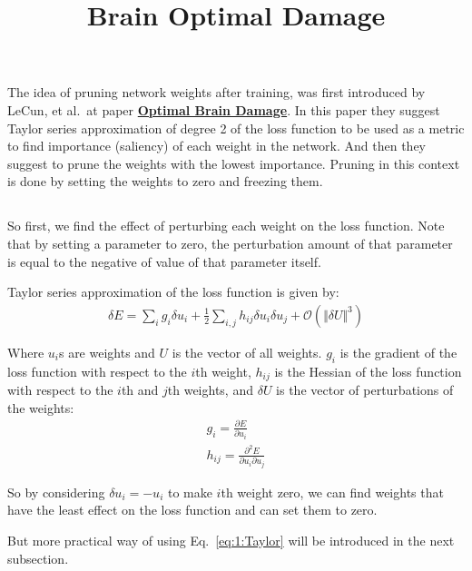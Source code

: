 \documentclass[]{article}
\title{Brain Optimal Damage}
\newcommand{\norm}[2][]{\Vert #2\Vert_{#1}}
\begin{document}
\maketitle
\section{}
The idea of pruning network weights after training, was first introduced by LeCun, et al.\ at paper \textbf{\href{https://proceedings.neurips.cc/paper/1989/file/6c9882bbac1c7093bd25041881277658-Paper.pdf}{Optimal Brain Damage}}.
In this paper they suggest Taylor series approximation of degree 2 of the loss function to be used as a metric to find importance (saliency) of each weight in the network.
And then they suggest to prune the weights with the lowest importance. Pruning in this context is done by setting the weights to zero and freezing them.

\subsection{}
So first, we find the effect of perturbing each weight on the loss function.
Note that by setting a parameter to zero, the perturbation amount of that parameter is equal to the negative of value of that parameter itself.

Taylor series approximation of the loss function is given by:
\begin{align}
\label{eq:1:Taylor}
\delta E = \sum_i g_i \delta u_i + \frac{1}{2} \sum_{i, j} h_{ij} \delta u_i \delta u_j + \mathcal{O}(\norm{\delta U}^3) 
\end{align}

Where $u_i$s are weights and $U$ is the vector of all weights.
$g_i$ is the gradient of the loss function with respect to the $i$th weight, $h_{ij}$ is the Hessian of the loss function with respect to the $i$th and $j$th weights, and $\delta U$ is the vector of perturbations of the weights:
\begin{align}
g_i = \frac{\partial E}{\partial u_i} \\
h_{ij} = \frac{\partial^2 E}{\partial u_i \partial u_j}
\end{align}

So by considering \(\delta u_i = -u_i\) to make \(i\)th weight zero, we can find weights that have the least effect on the loss function and can set them to zero.

But more practical way of using Eq.~\ref{eq:1:Taylor} will be introduced in the next subsection.
\end{document}
